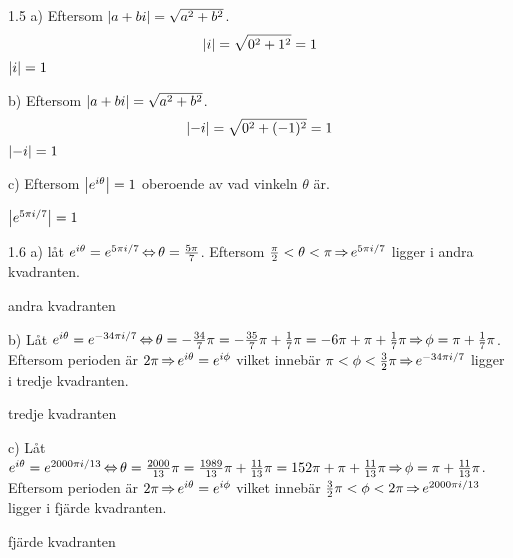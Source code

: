 \begin{task}{1.5 a)}
	Eftersom $\left|a+bi\right|=\sqrt{a^2+b^2}$.
	\[\left|i\right|=\sqrt{0^2+1^2}=1\]
	\ans $\left|i\right|=1$
\end{task}

\begin{task}{b)}
	Eftersom $\left|a+bi\right|=\sqrt{a^2+b^2}$.
	\[\left|-i\right|=\sqrt{0^2+(-1)^2}=1\]
	\ans $\left|-i\right|=1$
\end{task}

\begin{task}{c)}
	Eftersom $\left|e^{i\theta}\right|=1$ oberoende av vad vinkeln $\theta$ är.
	
	\ans $\left|e^{5\pi i/7}\right|=1$
\end{task}

\begin{task}{1.6 a)}
	låt $e^{i\theta}=e^{5\pi i/7} \operatorname{\Leftrightarrow} \theta=\frac{5\pi}{7}$. Eftersom $\frac{\pi}{2}<\theta<\pi \operatorname{\Rightarrow} e^{5\pi i/7}$ ligger i andra kvadranten.
	
	\ans andra kvadranten
\end{task}

\begin{task}{b)}
	Låt 
	$e^{i\theta}=e^{-34\pi i/7} \operatorname{\Leftrightarrow} 
	\theta=
	-\frac{34}{7}\pi=
	-\frac{35}{7}\pi+\frac{1}{7}\pi=
	-6\pi+\pi+\frac{1}{7}\pi \operatorname{\Rightarrow}
	\phi=\pi+\frac{1}{7}\pi$.
	Eftersom perioden är $2\pi \operatorname{\Rightarrow} e^{i\theta} = e^{i\phi}$ vilket innebär $\pi<\phi<\frac{3}{2}\pi \operatorname{\Rightarrow} e^{-34\pi i/7}$ ligger i tredje kvadranten.
	
	\ans tredje kvadranten
\end{task}

\begin{task}{c)}
	Låt 
	$e^{i\theta}=e^{2000\pi i/13} \operatorname{\Leftrightarrow} 
	\theta=
	\frac{2000}{13}\pi=
	\frac{1989}{13}\pi+\frac{11}{13}\pi=
	152\pi+\pi+\frac{11}{13}\pi \operatorname{\Rightarrow}
	\phi=\pi+\frac{11}{13}\pi$.
	Eftersom perioden är $2\pi \operatorname{\Rightarrow} e^{i\theta} = e^{i\phi}$ vilket innebär $\frac{3}{2}\pi<\phi<2\pi \operatorname{\Rightarrow} e^{2000\pi i/13}$ ligger i fjärde kvadranten.
	
	\ans fjärde kvadranten
\end{task}